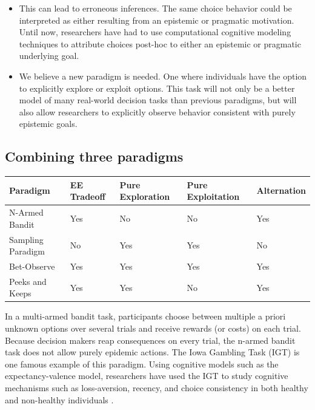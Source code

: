 \documentclass[a4paper,doc,natbib,floatsintext]{apa6}
\begin{document}
\begin{itemize}
  \item This can lead to erroneous inferences. The same choice behavior could be interpreted as either resulting from an epistemic or pragmatic motivation. Until now, researchers have had to use computational cognitive modeling techniques to attribute choices post-hoc to either an epistemic or pragmatic underlying goal.
  
  \item We believe a new paradigm is needed. One where individuals have the option to explicitly explore or exploit options. This task will not only be a better model of many real-world decision tasks than previous paradigms, but will also allow researchers to explicitly observe behavior consistent with purely epistemic goals.

\end{itemize}

\subsection{Combining three paradigms}


\begin{center}
    \begin{tabular}{ | l | l | l | l | l |}
    \hline
    Paradigm & EE Tradeoff & Pure Exploration & Pure Exploitation & Alternation \\ \hline
    N-Armed Bandit & Yes & No & No & Yes\\ \hline
    Sampling Paradigm & No & Yes & Yes & No\\ \hline
    Bet-Observe & Yes & Yes & Yes & Yes\\ \hline
    Peeks and Keeps & Yes & Yes & No & Yes\\ \hline
    \hline
    \end{tabular}
\end{center}


In a multi-armed bandit task, participants choose between multiple a priori unknown options over several trials and receive rewards (or costs) on each trial. Because decision makers reap consequences on every trial, the n-armed bandit task does not allow purely epidemic actions. The Iowa Gambling Task (IGT) is one famous example of this paradigm. Using cognitive models such as the expectancy-valence model, researchers have used the IGT to study cognitive mechanisms such as loss-aversion, recency, and choice consistency in both healthy and non-healthy individuals \citep{yechiam2005models}.
\end{document}
